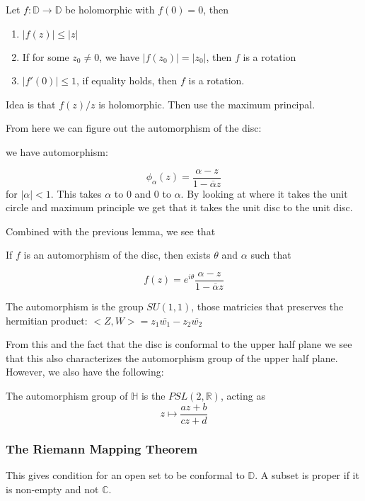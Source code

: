 \documentclass[main.tex]{subfiles}
\begin{document}
\begin{lemma}
Let $f: \mathbb{D} \rightarrow \mathbb{D}$ be holomorphic with $f(0) = 0$, then
\begin{enumerate}
    \item $|f(z)| \leq |z|$
    \item If for some $z_0 \neq 0$, we have $|f(z_0)| = |z_0|$, then $f$ is a rotation
    \item $|f'(0)| \leq 1$, if equality holds, then $f$ is a rotation.
\end{enumerate}
\end{lemma}

Idea is that $f(z)/z$ is holomorphic. Then use the maximum principal.

From here we can figure out the automorphism of the disc:

we have automorphism:

$$
\phi_\alpha(z) = \frac{\alpha - z}{1 - \overline{\alpha} z}
$$
for $|\alpha| < 1$. This takes $\alpha$ to $0$ and $0$ to $\alpha$. By looking at where it takes the unit circle and maximum principle we get that it takes the unit disc to the unit disc.

Combined with the previous lemma, we see that
\begin{theorem}
If $f$ is an automorphism of the disc, then exists $\theta$ and $\alpha$ such that 

$$
f(z) = e^{i\theta}\frac{\alpha - z}{1 - \overline{\alpha} z}
$$
\end{theorem}

The automorphism is the group $SU(1,1)$, those matricies that preserves the hermitian product:
$<Z, W> = z_1 \overline{w_1} - z_2 \overline{w_2}$

From this and the fact that the disc is conformal to the upper half plane we see that this also characterizes the automorphism group of the upper half plane. However, we also have the following:

\begin{theorem}
The automorphism group of $\mathbb{H}$ is the $PSL(2, \mathbb{R})$, acting as 
$$
z \mapsto \frac{az +b}{cz + d}
$$
\end{theorem}

\subsubsection{The Riemann Mapping Theorem}
This gives condition for an open set to be conformal to $\mathbb{D}$. A subset is proper if it is non-empty and not $\mathbb{C}$.
\end{document}
